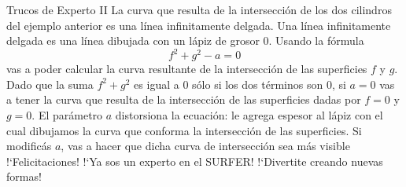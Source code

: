 \begin{surferPage}[Trucos II]{Trucos de Experto II}
La curva que resulta de la intersecci{\'o}n de los dos cilindros del ejemplo anterior es una l{\'i}nea infinitamente delgada. Una l{\'i}nea infinitamente delgada es una l{\'i}nea dibujada con un l{\'a}piz de grosor 0. Usando la f{\'o}rmula
\[ f^2+g^2-a=0\]
vas a poder calcular la curva resultante de la intersecci{\'o}n de las superficies $f$ y $g$. Dado que la suma $f^2+g^2$  es igual a $0$ s{\'o}lo si los dos t{\'e}rminos son $0$, si $a=0$ vas a tener la curva que resulta de la intersecci{\'o}n de las superficies dadas por $f=0$ y $g=0$.
 El par{\'a}metro $a$ distorsiona la ecuaci{\'o}n: le agrega espesor al l{\'a}piz con el cual dibujamos la curva que conforma la intersecci{\'o}n de las superficies. Si modific{\'a}s $a$, vas a hacer que dicha curva de intersecci{\'o}n sea m{\'a}s visible
\newline \newline
!`Felicitaciones! !`Ya sos un experto en el SURFER! !`Divertite creando nuevas formas!
\end{surferPage}

